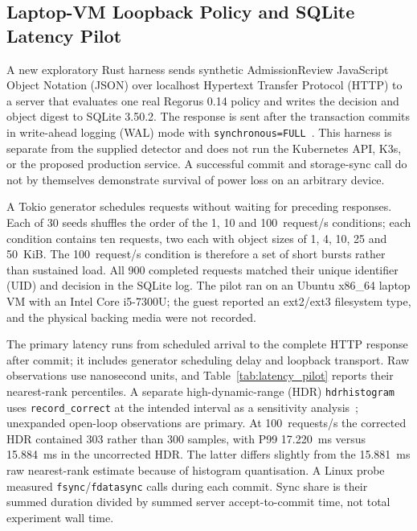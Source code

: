 \documentclass{ieeeaccess}
\begin{document}
\subsection{Laptop-VM Loopback Policy and SQLite Latency Pilot}
\label{subsec:latency_pilot}

A new exploratory Rust harness sends synthetic AdmissionReview JavaScript Object Notation (JSON) over localhost Hypertext Transfer Protocol (HTTP) to a server that evaluates one real Regorus 0.14 policy and writes the decision and object digest to SQLite 3.50.2. The response is sent after the transaction commits in write-ahead logging (WAL) mode with \texttt{synchronous=FULL}~\cite{b_latency_sqlite}. This harness is separate from the supplied detector and does not run the Kubernetes API, K3s, or the proposed production service. A successful commit and storage-sync call do not by themselves demonstrate survival of power loss on an arbitrary device.

A Tokio generator schedules requests without waiting for preceding responses. Each of 30 seeds shuffles the order of the 1, 10 and 100~request/s conditions; each condition contains ten requests, two each with object sizes of 1, 4, 10, 25 and 50~KiB. The 100~request/s condition is therefore a set of short bursts rather than sustained load. All 900 completed requests matched their unique identifier (UID) and decision in the SQLite log. The pilot ran on an Ubuntu x86\_64 laptop VM with an Intel Core i5-7300U; the guest reported an ext2/ext3 filesystem type, and the physical backing media were not recorded.

The primary latency runs from scheduled arrival to the complete HTTP response after commit; it includes generator scheduling delay and loopback transport. Raw observations use nanosecond units, and Table~\ref{tab:latency_pilot} reports their nearest-rank percentiles. A separate high-dynamic-range (HDR) \texttt{hdrhistogram} uses \texttt{record\_correct} at the intended interval as a sensitivity analysis~\cite{b_latency_hdr}; unexpanded open-loop observations are primary. At 100~requests/s the corrected HDR contained 303 rather than 300 samples, with P99 17.220~ms versus 15.884~ms in the uncorrected HDR. The latter differs slightly from the 15.881~ms raw nearest-rank estimate because of histogram quantisation. A Linux probe measured \texttt{fsync}/\texttt{fdatasync} calls during each commit. Sync share is their summed duration divided by summed server accept-to-commit time, not total experiment wall time.
\end{document}
